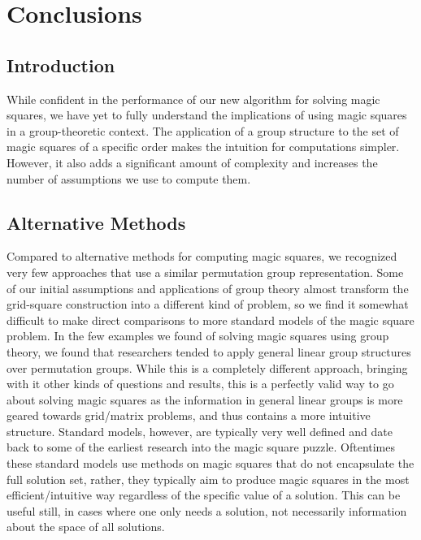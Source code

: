 \documentclass[12pt]{report}
\begin{document}
\chapter{Conclusions}

\section{Introduction}

\par While confident in the performance of our new algorithm for solving magic squares, we have yet
to fully understand the implications of using magic squares in a group-theoretic context. The
application of a group structure to the set of magic squares of a specific order makes the
intuition for computations simpler. However, it also adds a significant amount of complexity and
increases the number of assumptions we use to compute them.

\section{Alternative Methods}

\par Compared to alternative methods for computing magic squares, we recognized very few approaches
that use a similar permutation group representation. Some of our initial assumptions and
applications of group theory almost transform the grid-square construction into a different kind of
problem, so we find it somewhat difficult to make direct comparisons to more standard models of the
magic square problem. In the few examples we found of solving magic squares using group theory, we
found that researchers tended to apply general linear group structures over permutation groups.
While this is a completely different approach, bringing with it other kinds of questions and
results, this is a perfectly valid way to go about solving magic squares as the information in
general linear groups is more geared towards grid/matrix problems, and thus contains a more
intuitive structure. Standard models, however, are typically very well defined and date back to
some of the earliest research into the magic square puzzle. Oftentimes these standard models use
methods on magic squares that do not encapsulate the full solution set, rather, they typically aim
to produce magic squares in the most efficient/intuitive way regardless of the specific value of a
solution. This can be useful still, in cases where one only needs a solution, not necessarily
information about the space of all solutions.
\end{document}
